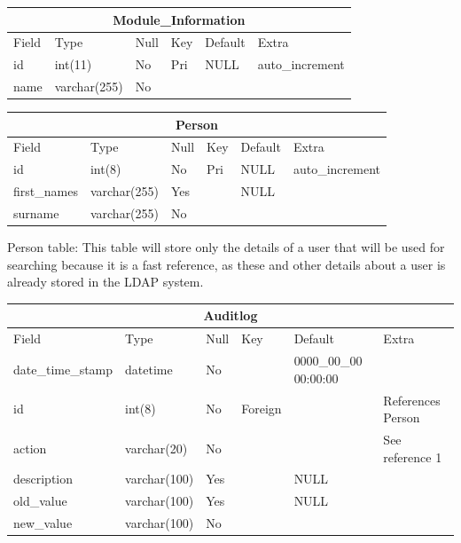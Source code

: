 \begin{table}[ht]
\begin{tabular}[c]{|p{3cm}||p{2.1cm}||p{1.2cm}||p{1.5cm}||p{2cm}|p{4cm}|}
  \hline
  \multicolumn{6}{|c|}{Module\_Information} \\
  \hline 
  Field & Type & Null & Key & Default & Extra \\ [0.5ex] %
  \hline
  id & int(11) & No & Pri & NULL & auto\_increment \\
  name & varchar(255) & No & & & \\
  \hline
\end{tabular}
\end{table} 

\begin{table}[ht]
\begin{tabular}[c]{|p{3cm}||p{2.1cm}||p{1.2cm}||p{1.5cm}||p{2cm}|p{4cm}|}
  \hline
  \multicolumn{6}{|c|}{Person} \\
  \hline 
  Field & Type & Null & Key & Default & Extra \\ [0.5ex] %
  \hline
  id & int(8) & No & Pri & NULL & auto\_increment \\
  first\_names & varchar(255) & Yes & & NULL & \\
  surname & varchar(255) & No & & & \\
  \hline
\end{tabular}
\end{table} 

Person table:
This table will store only the details of a user that will be used for searching because it is a fast reference, as these and other details about a user is already stored in the LDAP system.

\begin{table}[ht]
\begin{tabular}[c]{|p{3cm}||p{2.1cm}||p{1.2cm}||p{1.5cm}||p{2cm}|p{4cm}|}
  \hline
  \multicolumn{6}{|c|}{Auditlog} \\
  \hline 
  Field & Type & Null & Key & Default & Extra \\ [0.5ex] %
  \hline
  date\_time\_stamp & datetime & No & & 0000\_00\_00 00:00:00 & \\
  id & int(8) & No & Foreign & & References Person \\
  action & varchar(20) & No & & & See reference 1 \\
  description & varchar(100) & Yes & & NULL & \\
  old\_value & varchar(100) & Yes & & NULL & \\
  new\_value & varchar(100) & No & & & \\
  \hline
\end{tabular}
\end{table} 

